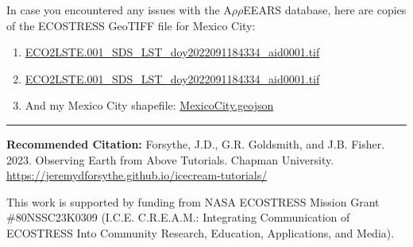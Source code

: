 \documentclass[oneside,a4paper,11pt,explicit]{book}
\begin{document}
\begin{tcolorbox}[colback=yellow!5!white,title=\textbf{Datafiles}]
	\large
	In case you encountered any issues with the A$\rho\rho$EEARS database, here are copies of the ECOSTRESS GeoTIFF file for Mexico City:

    \begin{enumerate}
        \item \href{https://jeremydforsythe.github.io/icecream-tutorials/Tutorial13_RasterCalculator/ECO2LSTE.001_SDS_LST_doy2022091184334_aid0001.tif}{\small ECO2LSTE.001\_SDS\_LST\_doy2022091184334\_aid0001.tif}
        \item \href{https://jeremydforsythe.github.io/icecream-tutorials/Tutorial13_RasterCalculator/ECO2LSTE.001_SDS_LST_doy2022091184334_aid0001.tif}{\small ECO2LSTE.001\_SDS\_LST\_doy2022091184334\_aid0001.tif}
        \item And my Mexico City shapefile: \href{https://jeremydforsythe.github.io/icecream-tutorials/Tutorial11_ESI/MexicoCityPolygon/MexicoCity.geojson}{\small MexicoCity.geojson}
    \end{enumerate}
\end{tcolorbox}


\hrule

\vspace{1em}

\small \textbf{Recommended Citation:} Forsythe, J.D., G.R. Goldsmith, and J.B. Fisher. 2023. Observing Earth from Above Tutorials. Chapman University. \url{https://jeremydforsythe.github.io/icecream-tutorials/}

\vspace{1em}

This work is supported by funding from NASA ECOSTRESS Mission Grant \#80NSSC23K0309 (I.C.E. C.R.E.A.M.: Integrating Communication of ECOSTRESS Into Community Research, Education, Applications, and Media).
\end{document}
